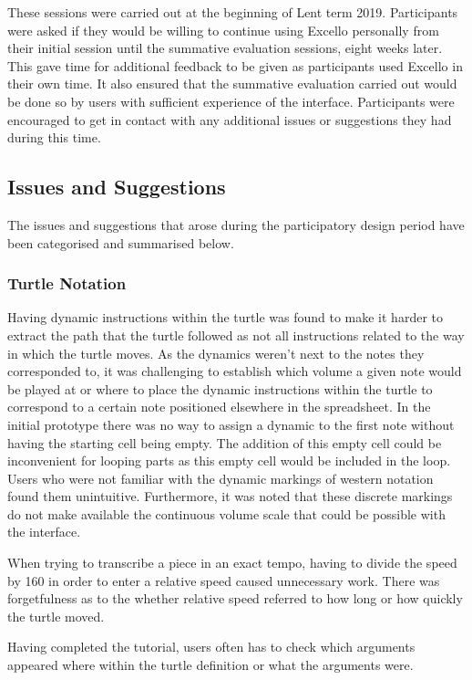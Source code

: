 These sessions were carried out at the beginning of Lent term 2019. Participants were asked if they would be willing to continue using Excello personally from their initial session until the summative evaluation sessions, eight weeks later. This gave time for additional feedback to be given as participants used Excello in their own time. It also ensured that the summative evaluation carried out would be done so by users with sufficient experience of the interface. Participants were encouraged to get in contact with any additional issues or suggestions they had during this time.

\subsection{Issues and Suggestions}

The issues and suggestions that arose during the participatory design period have been categorised and summarised below.

\subsubsection{Turtle Notation}

Having dynamic instructions within the turtle was found to make it harder to extract the path that the turtle followed as not all instructions related to the way in which the turtle moves. As the dynamics weren't next to the notes they corresponded to, it was challenging to establish which volume a given note would be played at or where to place the dynamic instructions within the turtle to correspond to a certain note positioned elsewhere in the spreadsheet. In the initial prototype there was no way to assign a dynamic to the first note without having the starting cell being empty. The addition of this empty cell could be inconvenient for looping parts as this empty cell would be included in the loop. Users who were not familiar with the dynamic markings of western notation found them unintuitive. Furthermore, it was noted that these discrete markings do not make available the continuous volume scale that could be possible with the interface.

When trying to transcribe a piece in an exact tempo, having to divide the speed by 160 in order to enter a relative speed caused unnecessary work. There was forgetfulness as to the whether relative speed referred to how long or how quickly the turtle moved.

Having completed the tutorial, users often has to check which arguments appeared where within the turtle definition or what the arguments were.

